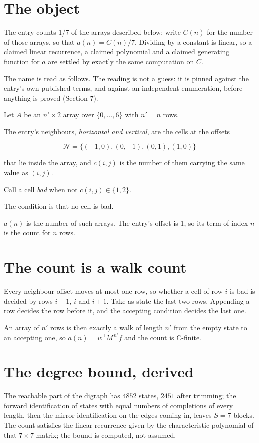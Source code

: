 \documentclass[11pt]{article}
\theoremstyle{definition}
\begin{document}
\section{The object}

The entry counts 1/7 of the arrays described below; write $C(n)$ for the number of those arrays, so that $a(n) = C(n)/7$. Dividing by a constant is linear, so a claimed linear recurrence, a claimed polynomial and a claimed generating function for $a$ are settled by exactly the same computation on $C$.

The name is read as follows. The reading is not a guess: it is pinned against the entry's own published terms, and against an independent enumeration, before anything is proved (Section 7).

Let $A$ be an $n' \times 2$ array over $\{0,\dots,6\}$ with $n' = n$ rows.

The entry's neighbours, {\itshape horizontal and vertical}, are the cells at the offsets

\[\mathcal{N} = \{(-1,0), (0,-1), (0,1), (1,0)\}\]

that lie inside the array, and $c(i,j)$ is the number of them carrying the same value as $(i,j)$.

Call a cell {\itshape bad} when not $c(i,j) \in \{1, 2\}$.

The condition is that no cell is bad.

$a(n)$ is the number of such arrays. The entry's offset is 1, so its term of index $n$ is the count for $n$ rows.

\section{The count is a walk count}

Every neighbour offset moves at most one row, so whether a cell of row $i$ is bad is decided by rows $i-1$, $i$ and $i+1$. Take as state the last two rows. Appending a row decides the row before it, and the accepting condition decides the last one.

An array of $n'$ rows is then exactly a walk of length $n'$ from the empty state to an accepting one, so $a(n) = w^{\mathsf T}M^{\,n'}f$ and the count is C-finite.

\section{The degree bound, derived}

The reachable part of the digraph has $4852$ states, $2451$ after trimming; the forward identification of states with equal numbers of completions of every length, then the mirror identification on the edges coming in, leaves $S = 7$ blocks. The count satisfies the linear recurrence given by the characteristic polynomial of that $7\times7$ matrix; the bound is computed, not assumed.
\end{document}
